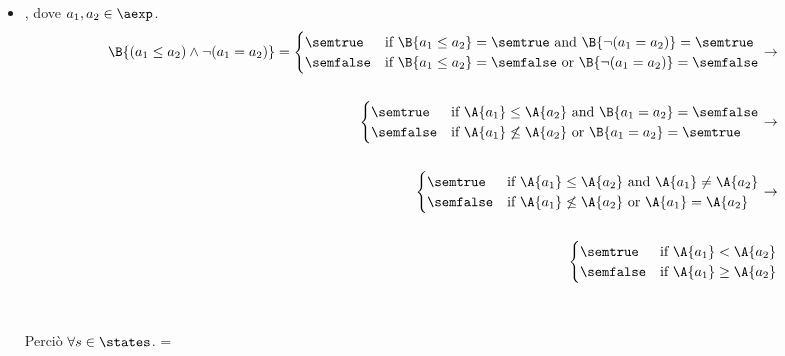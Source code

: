{\begin{enumerate}[label=\alph*)]
\begin{itemize}
    \item {}, dove $a_1, a_2 \in \aexp$. \\
      \begin{align*}
        \B{(a_1 \leq a_2) \land \lnot(a_1 = a_2)} = 
        \begin{cases}
        \semtrue &
        \mbox{if} \ \B{a_1 \leq a_2} = \semtrue
                    \mbox{ and }
                    \B{\lnot(a_1 = a_2)} = \semtrue \\
        \semfalse &
        \mbox{if} \ \B{a_1 \leq a_2} = \semfalse
                    \mbox{ or }
                    \B{\lnot(a_1 = a_2)} = \semfalse \\
        \end{cases}
        \rightarrow \\ \\
        \begin{cases}
        \semtrue &
        \mbox{if} \ \A{a_1} \leq \A{a_2}
                    \mbox{ and }
                    \B{a_1 = a_2} = \semfalse \\
        \semfalse &
        \mbox{if} \ \A{a_1} \not \leq \A{a_2}
                    \mbox{ or }
                    \B{a_1 = a_2} = \semtrue \\
        \end{cases}
        \rightarrow \\ \\
        \begin{cases}
        \semtrue &
        \mbox{if} \ \A{a_1} \leq \A{a_2}
                    \mbox{ and }
                    \A{a_1} \neq \A{a_2} \\
        \semfalse &
        \mbox{if} \ \A{a_1} \not \leq \A{a_2}
                    \mbox{ or }
                    \A{a_1} = \A{a_2} \\
        \end{cases}
        \rightarrow \\ \\
        \begin{cases}
        \semtrue &
        \mbox{if} \ \A{a_1} < \A{a_2} \\
        \semfalse &
        \mbox{if} \ \A{a_1} \geq \A{a_2} \\
        \end{cases}
      \end{align*} \\ \\
      Perciò $\forall s \in \states$. =
       \\


\end{itemize}
\end{enumerate}}
